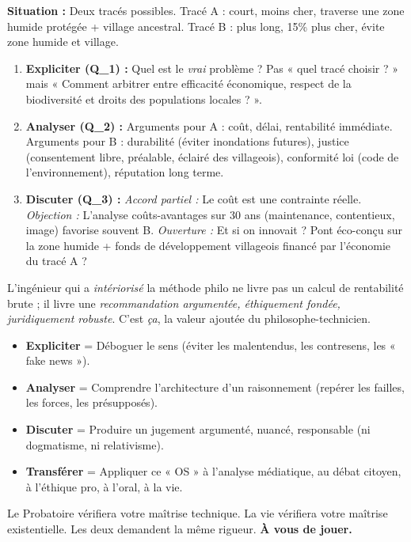 \documentclass[11pt]{article}
\newcommand{\cle}[1]{{\popxbold\color{popdark}#1}}
\begin{document}
\begin{exemplebox}
\textbf{Situation :} Deux tracés possibles. Tracé A : court, moins cher, traverse une zone humide protégée + village ancestral. Tracé B : plus long, 15\% plus cher, évite zone humide et village.
\begin{enumerate}
    \item \textbf{Expliciter (Q\_1) :} Quel est le \emph{vrai} problème ? Pas « quel tracé choisir ? » mais « Comment arbitrer entre efficacité économique, respect de la biodiversité et droits des populations locales ? ».
    \item \textbf{Analyser (Q\_2) :} Arguments pour A : coût, délai, rentabilité immédiate. Arguments pour B : durabilité (éviter inondations futures), justice (consentement libre, préalable, éclairé des villageois), conformité loi (code de l'environnement), réputation long terme.
    \item \textbf{Discuter (Q\_3) :} \emph{Accord partiel :} Le coût est une contrainte réelle. \emph{Objection :} L'analyse coûts-avantages sur 30 ans (maintenance, contentieux, image) favorise souvent B. \emph{Ouverture :} Et si on innovait ? Pont éco-conçu sur la zone humide + fonds de développement villageois financé par l'économie du tracé A ?
\end{enumerate}
L'ingénieur qui a \emph{intériorisé} la méthode philo ne livre pas un calcul de rentabilité brute ; il livre une \emph{recommandation argumentée, éthiquement fondée, juridiquement robuste}. C'est \emph{ça}, la valeur ajoutée du philosophe-technicien.
\end{exemplebox}

\begin{aretenir}
\begin{itemize}
    \item \textbf{\cle{Expliciter}} = Déboguer le sens (éviter les malentendus, les contresens, les « fake news »).
    \item \textbf{\cle{Analyser}} = Comprendre l'architecture d'un raisonnement (repérer les failles, les forces, les présupposés).
    \item \textbf{\cle{Discuter}} = Produire un jugement argumenté, nuancé, responsable (ni dogmatisme, ni relativisme).
    \item \textbf{\cle{Transférer}} = Appliquer ce « OS » à l'analyse médiatique, au débat citoyen, à l'éthique pro, à l'oral, à la vie.
\end{itemize}
Le Probatoire vérifiera votre maîtrise technique. La vie vérifiera votre maîtrise existentielle. Les deux demandent la même rigueur. \textbf{À vous de jouer.}
\end{aretenir}
\end{document}
